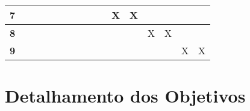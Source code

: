 \begin{table}[htb!]
\begin{tabular}{c|c|c|c|c|c|c|c|c|c|c|c|c|c|c|c|}
\multicolumn{1}{|c|}{{\bf 7}}         &         &         &               &         &         &         &         &         &         & X        & X       &         &         &         &         \\ \hline
\multicolumn{1}{|c|}{{\bf 8}}         &         &         &               &         &         &         &         &         &         &          &         & X       & X       &         &         \\ \hline
\multicolumn{1}{|c|}{{\bf 9}}         &         &         &               &         &         &         &         &         &         &          &         &         &         & X       & X       \\ \hline
\end{tabular}
\end{table}

\section{Detalhamento dos Objetivos}


